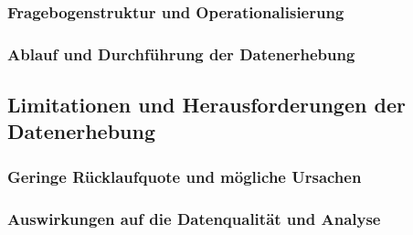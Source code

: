 \subsubsection{Fragebogenstruktur und Operationalisierung}

\subsubsection{Ablauf und Durchführung der Datenerhebung}

\subsection{Limitationen und Herausforderungen der Datenerhebung}

\subsubsection{Geringe Rücklaufquote und mögliche Ursachen}

\subsubsection{Auswirkungen auf die Datenqualität und Analyse}
